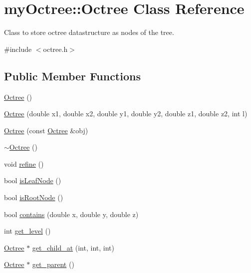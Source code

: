 \hypertarget{classmy_octree_1_1_octree}{}\section{my\+Octree\+:\+:Octree Class Reference}
\label{classmy_octree_1_1_octree}


Class to store octree datastructure as nodes of the tree.  




{\ttfamily \#include $<$octree.\+h$>$}

\subsection*{Public Member Functions}
\begin{DoxyCompactItemize}
\item 
\hyperlink{classmy_octree_1_1_octree_a030592b9e46f016e238aedd137fd5c32}{Octree} ()
\item 
\hyperlink{classmy_octree_1_1_octree_a8b4ad2213a628a5f2deddbcbfa8e8920}{Octree} (double x1, double x2, double y1, double y2, double z1, double z2, int l)
\item 
\hyperlink{classmy_octree_1_1_octree_a6519dd2b6d012d28e81bb984baa8a54f}{Octree} (const \hyperlink{classmy_octree_1_1_octree}{Octree} \&obj)
\item 
\hyperlink{classmy_octree_1_1_octree_a29fe8f3281ac81a3816773b2380a6338}{$\sim$\+Octree} ()
\item 
void \hyperlink{classmy_octree_1_1_octree_ae8980a3e1e691b9aeabc6cc0a3783fb4}{refine} ()
\item 
bool \hyperlink{classmy_octree_1_1_octree_a9fc5028ff6bbef403cee64fafbd80aea}{is\+Leaf\+Node} ()
\item 
bool \hyperlink{classmy_octree_1_1_octree_a9811e45e1a415625fa17fb78856036e3}{is\+Root\+Node} ()
\item 
bool \hyperlink{classmy_octree_1_1_octree_a6435ca44d808be1f8132c647e216556c}{contains} (double x, double y, double z)
\item 
int \hyperlink{classmy_octree_1_1_octree_a247f0190625a53bad444f0d0bee93239}{get\+\_\+level} ()
\item 
\hyperlink{classmy_octree_1_1_octree}{Octree} $\ast$ \hyperlink{classmy_octree_1_1_octree_a342b6d295162f2e5441fa1009b0b2d15}{get\+\_\+child\+\_\+at} (int, int, int)
\item 
\hyperlink{classmy_octree_1_1_octree}{Octree} $\ast$ \hyperlink{classmy_octree_1_1_octree_a8d78bbc816d91f0c705c0e56f7459269}{get\+\_\+parent} ()

\end{DoxyCompactItemize}

